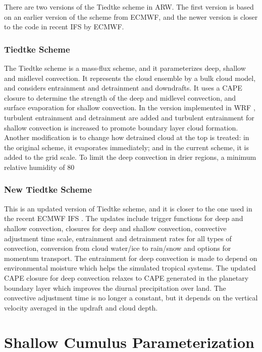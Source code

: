There are two versions of the Tiedtke scheme \citep{tiedtke89} in ARW. The first version is based on an earlier version 
of the scheme from ECMWF, and the newer version is closer to the code in recent IFS by ECMWF.

\subsubsection{Tiedtke Scheme}

The Tiedtke scheme is a mass-flux scheme, and it parameterizes deep, 
shallow and midlevel convection. It represents the cloud ensemble by a bulk cloud model, 
and considers entrainment and detrainment and downdrafts. It uses a CAPE closure to 
determine the strength of the deep and midlevel convection, and surface evaporation 
for shallow convection. In the version implemented in WRF \citep{zhangc11}, turbulent 
entrainment and detrainment are added and turbulent entrainment for shallow convection 
is increased to promote boundary layer cloud formation. Another modification is to change 
how detrained cloud at the top is treated: in the original scheme, it evaporates immediately; 
and in the current scheme, it is added to the grid scale. To limit the deep convection in 
drier regions, a minimum relative humidity of 80%

\subsubsection{New Tiedtke Scheme}

This is an updated version of Tiedtke scheme, and it is closer to the one used in the 
recent ECMWF IFS \citep{zhangc17}. The updates include trigger functions for deep and shallow convection, 
closures for deep and shallow convection, convective adjustment time scale, entrainment 
and detrainment rates for all types of convection, conversion from cloud water/ice to 
rain/snow and options for momentum transport. The entrainment for deep convection is 
made to depend on environmental moisture which helps the simulated tropical systems. 
The updated CAPE closure for deep convection relaxes to CAPE generated in the planetary 
boundary layer which improves the diurnal precipitation over land. The convective 
adjustment time is no longer a constant, but it depends on the vertical velocity averaged 
in the updraft and cloud depth.


\section{Shallow Cumulus Parameterization}

